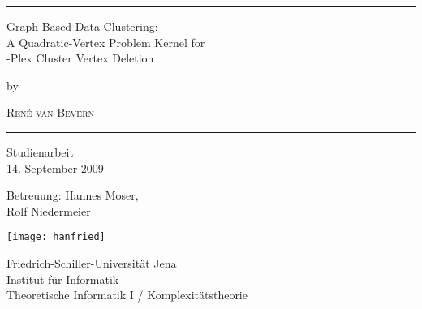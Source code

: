 \documentclass[12pt, a4paper, abstracton]{scrreprt}
\theoremstyle{definition}
\theoremstyle{remark}
\begin{document}
\begin{titlepage}
\thispagestyle{scrheadings}
\cfoot{}
\setfootsepline{0.5pt}
\centering
\noindent \rule{\textwidth}{0.5pt}

\vspace{1em}
\Large Graph-Based Data Clustering:\\\Huge A Quadratic-\!Vertex Problem Kernel for\\-Plex Cluster Vertex Deletion

\normalsize\vspace{1.12\topsep}\large
by

\normalsize\vspace{\topsep}\Large
\textsc{Ren\'e van Bevern}\\
\rule{\textwidth}{0.5pt}

\vfill
\Large Studienarbeit\\
\normalsize 14. September 2009

\vspace{\topsep}
  Betreuung: Hannes Moser,\\
  Rolf Niedermeier      

\vfill
\normalfont
\texttt{[image: hanfried]}

\vspace{\topsep}
Friedrich-Schiller-Universität Jena\\
  Institut für Informatik\\
  Theoretische Informatik I / Komplexitätstheorie
\end{titlepage}
\end{document}
